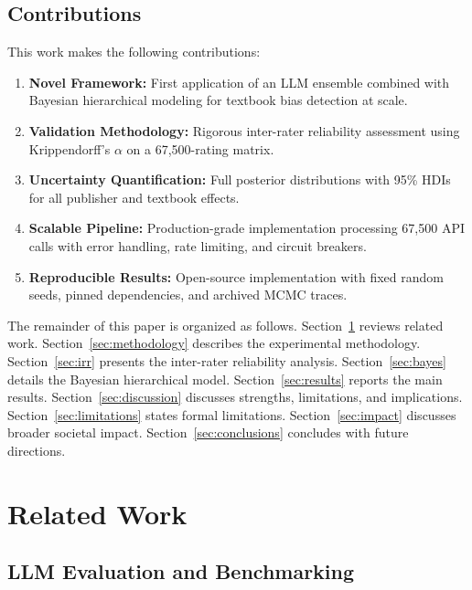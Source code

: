 \documentclass[10pt,letterpaper]{article}
\begin{document}
\subsection{Contributions}

This work makes the following contributions:
\begin{enumerate}
  \item \textbf{Novel Framework:} First application of an LLM ensemble combined
        with Bayesian hierarchical modeling for textbook bias detection at scale.
  \item \textbf{Validation Methodology:} Rigorous inter-rater reliability
        assessment using Krippendorff's $\alpha$ on a 67,500-rating matrix.
  \item \textbf{Uncertainty Quantification:} Full posterior distributions with
        95\% HDIs for all publisher and textbook effects.
  \item \textbf{Scalable Pipeline:} Production-grade implementation processing
        67,500 API calls with error handling, rate limiting, and circuit breakers.
  \item \textbf{Reproducible Results:} Open-source implementation with fixed
        random seeds, pinned dependencies, and archived MCMC traces.
\end{enumerate}

The remainder of this paper is organized as follows.
Section~\ref{sec:related} reviews related work.
Section~\ref{sec:methodology} describes the experimental methodology.
Section~\ref{sec:irr} presents the inter-rater reliability analysis.
Section~\ref{sec:bayes} details the Bayesian hierarchical model.
Section~\ref{sec:results} reports the main results.
Section~\ref{sec:discussion} discusses strengths, limitations, and implications.
Section~\ref{sec:limitations} states formal limitations.
Section~\ref{sec:impact} discusses broader societal impact.
Section~\ref{sec:conclusions} concludes with future directions.

\section{Related Work}
\label{sec:related}

\subsection{LLM Evaluation and Benchmarking}
\end{document}
